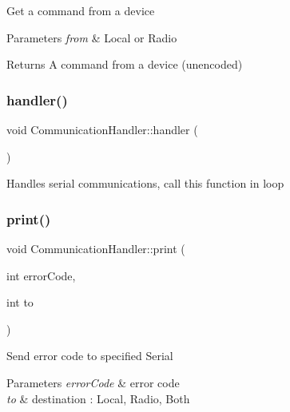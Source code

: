 Get a command from a device 
\begin{DoxyParams}{Parameters}
{\em from} & Local or Radio \\
\hline
\end{DoxyParams}
\begin{DoxyReturn}{Returns}
A command from a device (unencoded) 
\end{DoxyReturn}
\mbox{\label{class_communication_handler_a46bfbaf36bbe568f21e7d8b144785c93}} 
\subsubsection{\texorpdfstring{handler()}{handler()}}
{\footnotesize\ttfamily void Communication\+Handler\+::handler (\begin{DoxyParamCaption}{ }\end{DoxyParamCaption})}

Handles serial communications, call this function in loop \mbox{\label{class_communication_handler_aac8445340aa425833ba870ddec125a1a}} 
\subsubsection{\texorpdfstring{print()}{print()}\hspace{0.1cm}{\footnotesize\ttfamily [1/2]}}
{\footnotesize\ttfamily void Communication\+Handler\+::print (\begin{DoxyParamCaption}\item[{int}]{error\+Code,  }\item[{int}]{to }\end{DoxyParamCaption})}

Send error code to specified Serial 
\begin{DoxyParams}{Parameters}
{\em error\+Code} & error code \\
\hline
{\em to} & destination \+: Local, Radio, Both \\
\hline
\end{DoxyParams}
\mbox{\label{class_communication_handler_a46989cd4824801824ac16afde03677d3}} 
